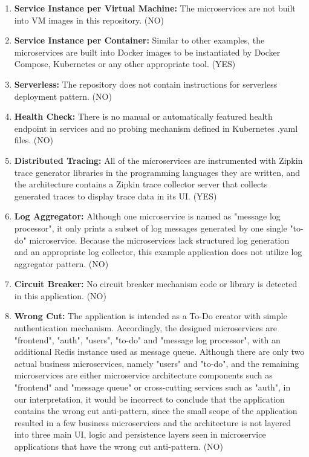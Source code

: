 \documentclass{Configuration_Files/PoliMi3i_thesis}
\begin{document}
\begin{enumerate}
    \item \textbf{Service Instance per Virtual Machine:} The microservices are not built into VM images in this repository. (NO)
    
    \item \textbf{Service Instance per Container:} Similar to other examples, the microservices are built into Docker images to be instantiated by Docker Compose, Kubernetes or any other appropriate tool. (YES)
    
    \item \textbf{Serverless:} The repository does not contain instructions for serverless deployment pattern. (NO)
    
    \item \textbf{Health Check:} There is no manual or automatically featured health endpoint in services and no probing mechanism defined in Kubernetes .yaml files. (NO)
    
    \item \textbf{Distributed Tracing:} All of the microservices are instrumented with Zipkin trace generator libraries in the programming languages they are written, and the architecture contains a Zipkin trace collector server that collects generated traces to display trace data in its UI. (YES)
    
    \item \textbf{Log Aggregator:} Although one microservice is named as "message log processor", it only prints a subset of log messages generated by one single "to-do" microservice.
    Because the microservices lack structured log generation and an appropriate log collector, this example application does not utilize log aggregator pattern. (NO)
    
    \item \textbf{Circuit Breaker:} No circuit breaker mechanism code or library is detected in this application. (NO)
    
    \item \textbf{Wrong Cut:} The application is intended as a To-Do creator with simple authentication mechanism.
    Accordingly, the designed microservices are "frontend", "auth", "users", "to-do" and "message log processor", with an additional Redis instance used as message queue.
    Although there are only two actual business microservices, namely "users" and "to-do", and the remaining microservices are either microservice architecture components such as "frontend" and "message queue" or cross-cutting services such as "auth", in our interpretation, it would be incorrect to conclude that the application contains the wrong cut anti-pattern, since the small scope of the application resulted in a few business microservices and the architecture is not layered into three main UI, logic and persistence layers seen in microservice applications that have the wrong cut anti-pattern. (NO)
    

\end{enumerate}
\end{document}
